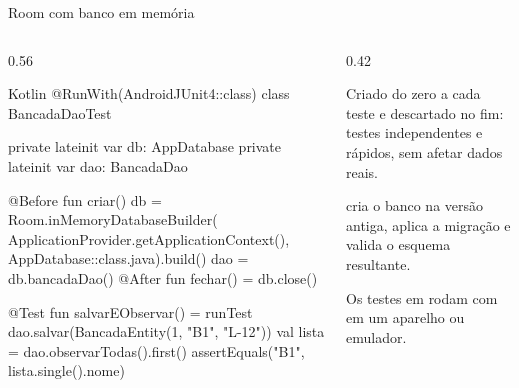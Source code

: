 \documentclass[aspectratio=169,10pt]{beamer}
\begin{document}
\begin{frame}[fragile]{Room com banco em memória}
  \begin{columns}[T]
    \begin{column}{0.56\textwidth}
\begin{codigo}[title=src/androidTest/.../BancadaDaoTest.kt]{Kotlin}
@RunWith(AndroidJUnit4::class)
class BancadaDaoTest {
  private lateinit var db: AppDatabase
  private lateinit var dao: BancadaDao

  @Before fun criar() {
    db = Room.inMemoryDatabaseBuilder(
      ApplicationProvider.getApplicationContext(),
      AppDatabase::class.java).build()
    dao = db.bancadaDao()
  }
  @After fun fechar() = db.close()

  @Test fun salvarEObservar() = runTest {
    dao.salvar(BancadaEntity(1, "B1", "L-12"))
    val lista = dao.observarTodas().first()
    assertEquals("B1", lista.single().nome)
  }
}
\end{codigo}
    \end{column}
    \begin{column}{0.42\textwidth}
      \begin{conceito}
        Criado do zero a cada teste e descartado no fim: testes independentes e rápidos, sem afetar dados reais.
      \end{conceito}
      \begin{dica}[Migrações]
         cria o banco na versão antiga, aplica a migração e valida o esquema resultante.
      \end{dica}
      \begin{dica}
        Os testes em  rodam com  em um aparelho ou emulador.
      \end{dica}
    \end{column}
  \end{columns}
\end{frame}
\end{document}
